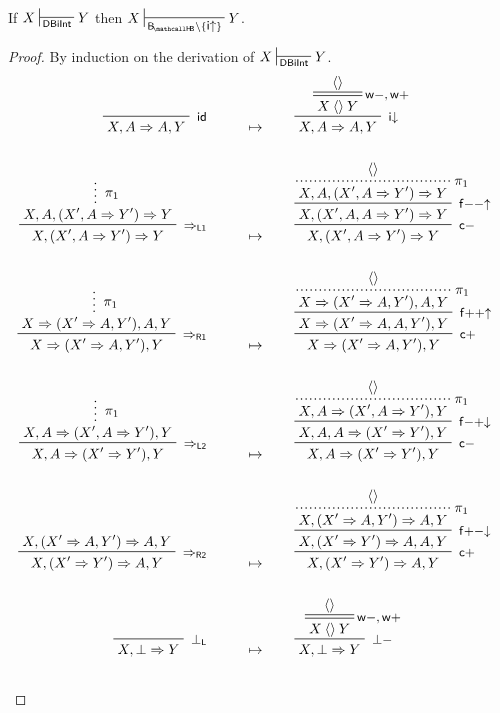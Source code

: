 \begin{lemma}
  
  If $X \prov{\msys{DBiInt}} Y$ then $X \prov{\sysBHB \setminus
  \{\rsf{i{\ua}}\}} Y$.
\end{lemma}
\begin{proof}
  By induction on the derivation of $X \prov{\msys{DBiInt}} Y$. 
  \begin{align*}
    \R[\rsf{id}]
      {}
      {X, A \seq A, Y}
    &\mt
    \R[\rsf{i{\da}}]
    {\prftree[r][d]{\rsf{w{-},w{+}}}
    {\piq{}}
    {X \piq{} Y}}
    {X, A \seq A, Y}
    \\\\
    \R[\rsf{\seq_{L1}}]
      {\summ[$\pi_1$]{X, A, (X', A \seq Y') \seq Y}}
      {X, (X', A \seq Y') \seq Y}
    &\mt
    \R[\rsf{c{-}}]
    {\R[\rsf{f{-}{-}{\ua}}]
    {\prftree[r][dotted]{$\pi_1$}
    {\piq{}}
    {X, A, (X', A \seq Y') \seq Y}}
    {X, (X', A, A \seq Y') \seq Y}}
    {X, (X', A \seq Y') \seq Y}
    \\\\
    \R[\rsf{\seq_{R1}}]
      {\summ[$\pi_1$]{X \seq  (X' \seq A, Y'), A, Y}}
      {X \seq (X' \seq A, Y'), Y}
    &\mt
    \R[\rsf{c{+}}]
    {\R[\rsf{f{+}{+}{\ua}}]
    {\prftree[r][dotted]{$\pi_1$}
    {\piq{}}
    {X \seq (X' \seq A, Y'), A, Y}}
    {X \seq (X' \seq A, A, Y'), Y}}
    {X \seq (X' \seq A, Y'), Y}
    \\\\
    \R[\rsf{\seq_{L2}}]
      {\summ[$\pi_1$]{X, A \seq (X', A \seq Y'), Y}}
      {X, A \seq (X' \seq Y'), Y}
    &\mt
    \R[\rsf{c{-}}]
    {\R[\rsf{f{-}{+}{\da}}]
    {\prftree[r][dotted]{$\pi_1$}
    {\piq{}}
    {X, A \seq (X', A \seq Y'), Y}}
    {X, A, A \seq (X' \seq Y'), Y}}
    {X, A \seq (X' \seq Y'), Y}
    \\\\
    \R[\rsf{\seq_{R2}}]
      {X, (X' \seq A, Y') \seq A, Y}
      {X, (X' \seq Y') \seq A, Y}
    &\mt
    \R[\rsf{c{+}}]
    {\R[\rsf{f{+}{-}{\da}}]
    {\prftree[r][dotted]{$\pi_1$}
    {\piq{}}
    {X, (X' \seq A, Y') \seq A, Y}}
    {X, (X' \seq Y') \seq A, A, Y}}
    {X, (X' \seq Y') \seq A, Y}
    \\\\
    \R[\rsf{\bot_L}]
      {}
      {X, \bot \seq Y}
    &\mt
    \R[\rsf{\bot{-}}]
    {\prftree[r][d]{\rsf{w{-},w{+}}}
    {\piq{}}
    {X \piq{} Y}}
    {X, \bot \seq Y}
    \\\\

\end{align*}
\end{proof}
